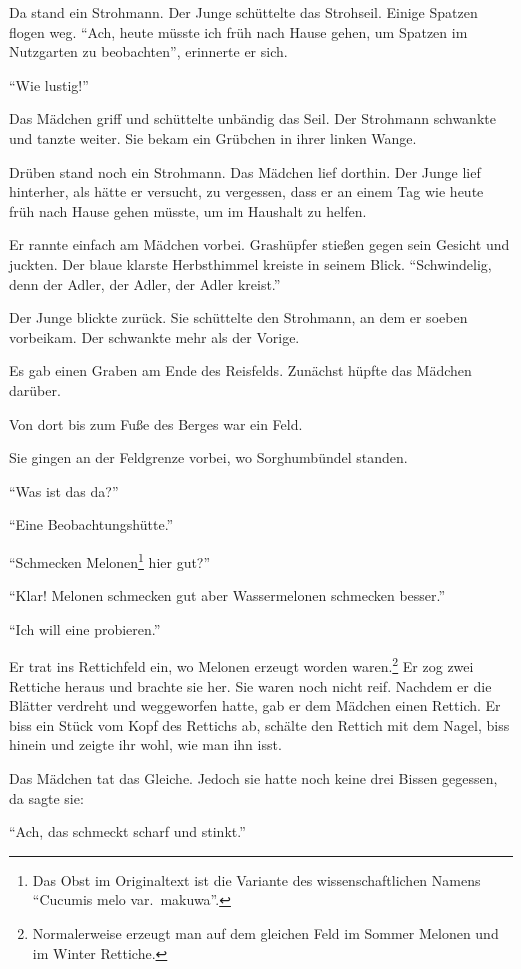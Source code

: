 \documentclass[prd,a4paper,12pt,tightenlines,notitlepage,nofootinbib]{revtex4-1}
\begin{document}
Da stand ein Strohmann.  Der Junge schüttelte das Strohseil.  Einige
Spatzen flogen weg.  "`Ach, heute müsste ich früh nach Hause gehen, um
Spatzen im Nutzgarten zu beobachten"', erinnerte er sich.

"`Wie lustig!"'

Das Mädchen griff und schüttelte unbändig das Seil.  Der Strohmann schwankte und
tanzte weiter.  Sie bekam ein Grübchen in ihrer linken Wange.

Drüben
stand noch ein Strohmann.  Das Mädchen lief dorthin.  Der Junge lief hinterher,
als hätte er versucht, zu vergessen, dass er an einem Tag wie heute
früh nach Hause gehen müsste, um im Haushalt zu helfen.

Er rannte
einfach am Mädchen vorbei.  Grashüpfer stießen gegen sein
Gesicht und juckten.  Der blaue klarste Herbsthimmel kreiste in seinem Blick.
"`Schwindelig, denn der Adler, der Adler, der Adler kreist."'

Der Junge blickte
zurück.  Sie schüttelte den Strohmann, an dem er soeben vorbeikam.  Der
schwankte mehr als der Vorige.

Es gab einen Graben am Ende des
Reisfelds.  Zunächst hüpfte das Mädchen darüber.

Von dort bis zum Fuße
des Berges war ein Feld.

Sie gingen an der Feldgrenze vorbei, wo
Sorghumbündel standen.

"`Was ist das da?"'

"`Eine Beobachtungshütte."'

"`Schmecken Melonen\footnote{
  Das Obst im Originaltext ist die Variante des wissenschaftlichen Namens
  "`Cucumis melo var.\ makuwa"'.}
hier gut?"'

"`Klar!  Melonen schmecken gut aber Wassermelonen schmecken besser."'

"`Ich will eine probieren."'

Er trat ins Rettichfeld ein, wo Melonen erzeugt worden waren.\footnote{
Normalerweise erzeugt man auf dem gleichen Feld
im Sommer Melonen und im Winter Rettiche.}
Er zog
zwei Rettiche heraus und brachte sie her.  Sie waren noch nicht reif.
Nachdem er die Blätter verdreht und weggeworfen hatte, gab er dem Mädchen einen
Rettich.  Er biss ein Stück vom Kopf des Rettichs ab, schälte den
Rettich mit dem Nagel, biss hinein und zeigte ihr wohl, wie man ihn
isst.

Das Mädchen tat das Gleiche.  Jedoch sie hatte noch keine drei
Bissen gegessen, da sagte sie:

"`Ach, das schmeckt scharf und stinkt."'
\end{document}
